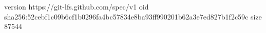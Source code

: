 version https://git-lfs.github.com/spec/v1
oid sha256:52cebf1c09b6cf1b0296fa4bc57834e8ba93ff990201b62a3e7ed827b1f2c59c
size 87544
